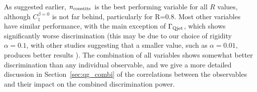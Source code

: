 %
As suggested earlier, $n_{\rm constits}$ is the best performing variable for all $R$ values, although $C_1^{\beta=0}$ is not far behind, particularly
for R=0.8. Most other variables have similar performance, with the main exception of $\Gamma_{\rm Qjet}$, which shows significantly worse
discrimination (this may be due to our choice of
rigidity $\alpha = 0.1$, with other studies suggesting that a smaller value,
such as $\alpha = 0.01$, produces better results \cite{Ellis:2012sn,Ellis:2014eya}). The combination of all variables shows somewhat better discrimination than any individual observable, and
we  give a more detailed discussion in Section~\ref{sec:qg_combi} of the correlations between the observables and their impact on the combined discrimination power.

%
\begin{figure}
\centering
{}
\\
\\

\end{figure}
